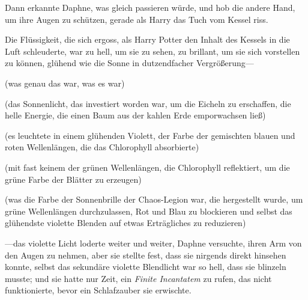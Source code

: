 Dann erkannte Daphne, was gleich passieren würde, und hob die andere Hand, um ihre Augen zu schützen, gerade als Harry das Tuch vom Kessel riss.

Die Flüssigkeit, die sich ergoss, als Harry Potter den Inhalt des Kessels in die Luft schleuderte, war zu hell, um sie zu sehen, zu brillant, um sie sich vorstellen zu können, glühend wie die Sonne in dutzendfacher Vergrößerung—

(was genau das war, was es war)

(das Sonnenlicht, das investiert worden war, um die Eicheln zu erschaffen, die helle Energie, die einen Baum aus der kahlen Erde emporwachsen ließ)

(es leuchtete in einem glühenden Violett, der Farbe der gemischten blauen und roten Wellenlängen, die das Chlorophyll absorbierte)

(mit fast keinem der grünen Wellenlängen, die Chlorophyll reflektiert, um die grüne Farbe der Blätter zu erzeugen)

(was die Farbe der Sonnenbrille der Chaos-Legion war, die hergestellt wurde, um grüne Wellenlängen durchzulassen, Rot und Blau zu blockieren und selbst das glühendste violette Blenden auf etwas Erträgliches zu reduzieren)

—das violette Licht loderte weiter und weiter, Daphne versuchte, ihren Arm von den Augen zu nehmen, aber sie stellte fest, dass sie nirgends direkt hinsehen konnte, selbst das sekundäre violette Blendlicht war so hell, dass sie blinzeln musste; und sie hatte nur Zeit, ein \emph{Finite Incantatem} zu rufen, das nicht funktionierte, bevor ein Schlafzauber sie erwischte.

